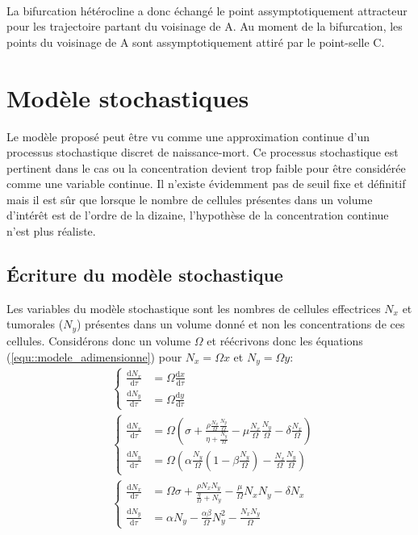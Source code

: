 \documentclass[12pt]{article}
\newcommand{\deriv}{\mathrm{d}}
\newcommand{\dtau}[1]{\frac{\deriv #1}{\deriv \tau}}
\begin{document}
\paragraph{} La bifurcation hétérocline a donc échangé le point assymptotiquement attracteur pour les trajectoire partant du voisinage de A. Au moment de la bifurcation, les points du voisinage de A sont assymptotiquement attiré par le point-selle C.

\section{Modèle stochastiques}
Le modèle proposé peut être vu comme une approximation continue d'un processus stochastique discret de naissance-mort. Ce processus stochastique est pertinent dans le cas ou la concentration devient trop faible pour être considérée comme une variable continue. Il n'existe évidemment pas de seuil fixe et définitif mais il est sûr que lorsque le nombre de cellules présentes dans un volume d'intérêt est de l'ordre de la dizaine, l'hypothèse de la concentration continue n'est plus réaliste.

\subsection{\'Ecriture du mod\`ele stochastique}
Les variables du modèle stochastique sont les nombres de cellules effectrices $N_x$ et tumorales ($N_y$) présentes dans un volume donné et non les concentrations de ces cellules. Considérons donc un volume $\Omega$ et réécrivons donc les équations (\ref{equ::modele_adimensionne}) pour $N_x = \Omega x$ et $N_y = \Omega y$: 
\begin{align*}
    &\left\{\begin{aligned}
        \dtau{N_x} &= \Omega \dtau{x} \\
        \dtau{N_y} &= \Omega \dtau{y}
    \end{aligned}\right.\\
    &\left\{\begin{aligned}
        \dtau{N_x} &= \Omega \left(\sigma + \frac{\rho \frac{N_x}{\Omega}\frac{N_y}{\Omega}}{\eta + \frac{N_y}{\Omega}} - \mu \frac{N_x}{\Omega}\frac{N_y}{\Omega} -\delta \frac{N_x}{\Omega}\right) \\
        \dtau{N_y} &= \Omega \left( \alpha \frac{N_y}{\Omega} (1- \beta \frac{N_y}{\Omega}) - \frac{N_x}{\Omega}\frac{N_y}{\Omega}\right)
    \end{aligned}\right.\\
    &\left\{\begin{aligned}
        \dtau{N_x} &= \Omega \sigma + \frac{\rho N_x N_y}{\frac{\eta}{\Omega} + N_y }- \frac{\mu}{\Omega} N_x N_y  -\delta N_x\\
        \dtau{N_y} &= \alpha N_y - \frac{\alpha \beta}{\Omega}N_y^2- \frac{N_x N_y}{\Omega}
    \end{aligned}\right.
\end{align*}\\
\end{document}

